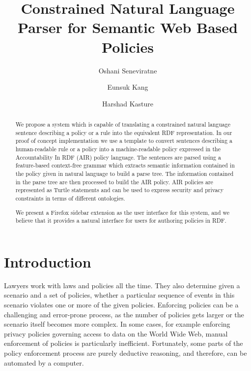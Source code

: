 \documentclass{llncs}
\begin{document}
\title{Constrained Natural Language Parser for Semantic Web Based Policies}

\author{Oshani Seneviratne \and Eunsuk Kang \and Harshad Kasture}


\maketitle
\begin{abstract}

We propose a system which is capable of translating a constrained natural language sentence describing a policy or a rule into the equivalent RDF representation. In our proof of concept implementation we use a template to convert sentences describing a human-readable rule or a policy into a machine-readable policy expressed in the Accountability In RDF (AIR) policy language. The sentences are parsed using a feature-based context-free grammar which extracts semantic information contained in the policy given in natural language to build a parse tree. The information contained in the parse tree are then processed to build the AIR policy. AIR policies are represented as Turtle statements and can be used to express security and privacy constraints in terms of different ontologies.

We present a Firefox sidebar extension as the user interface for this system, and we believe that it provides a natural interface for users for authoring policies in RDF.

\end{abstract}


\section{Introduction}								
\label{sec:intro}

Lawyers work with laws and policies all the time. They also determine given a scenario and a set of policies, whether a particular sequence of events in this scenario violates one or more of the given policies. Enforcing policies can be a challenging and error-prone process, as the number of policies gets larger or the scenario itself becomes more complex. In some cases, for example enforcing privacy policies governing access to data on the World Wide Web, manual enforcement of policies is particularly inefficient. Fortunately, some parts of the policy enforcement process are purely deductive reasoning, and therefore, can be automated by a computer. 
\end{document}
